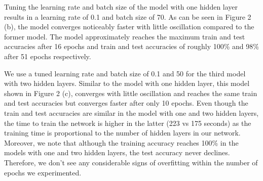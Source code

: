 \documentclass[10pt]{article}
\begin{document}
Tuning the learning rate and batch size of the model with one hidden layer results in a learning rate of 0.1 and batch size of 70. As can be seen in Figure 2 (b), the model converges noticeably faster with little oscillation compared to the former model. The model approximately reaches the maximum train and test accuracies after 16 epochs and train and test accuracies of roughly 100\% and 98\% after 51 epochs respectively.

We use a tuned learning rate and batch size of 0.1 and 50 for the third model with two hidden layers. Similar to the model with one hidden layer, this model shown in Figure 2 (c), converges with little oscillation and reaches the same train and test accuracies but converges faster after only 10 epochs. Even though the train and test accuracies are similar in the model with one and two hidden layers, the time to train the network is higher in the latter (223 vs 175 seconds) as the training time is proportional to the number of hidden layers in our network. Moreover, we note that although the training accuracy reaches 100\% in the models with one and two hidden layers, the test accuracy never declines. Therefore, we don't see any considerable signs of overfitting within the number of epochs we experimented.
\end{document}
